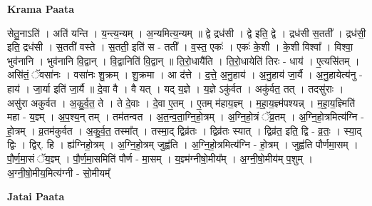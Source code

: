 \documentclass[17pt]{extarticle}
\begin{document}
\textbf{Krama Paata} \newline

सेतु॒नाऽति॑ । अति॑ यन्ति । य॒न्त्य॒न्यम् । अ॒न्यमित्य॒न्यम् ॥ द्वे द्रध॑सी । द्वे इति॒ द्वे । द्रध॑सी स॒तती᳚ । द्रध॑सी॒ इति॒ द्रध॑सी । स॒तती॑ वस्ते । स॒तती॒ इति॑ स - तती᳚ । व॒स्त॒ एकः॑ । एकः॑ के॒शी । के॒शी विश्वा᳚ । विश्वा॒ भुव॑नानि । भुव॑नानि वि॒द्वान् । वि॒द्वानिति॑ वि॒द्वान् ॥ ति॒रो॒धायै॑ति । ति॒रो॒धायेति॑ तिरः - धाय॑ । ए॒त्यसि॑तम् । असि॑तं॒ ॅवसा॑नः । वसा॑नः शु॒क्रम् । शु॒क्रमा । आ द॑त्ते । द॒त्ते॒ अ॒नु॒हाय॑ । अ॒नु॒हाय॑ जा॒र्यै । अ॒नु॒हायेत्य॑नु - हाय॑ । जा॒र्या इति॑ जा॒र्यै ॥ दे॒वा वै । वै यत् । यद् य॒ज्ञे । य॒ज्ञे ऽकु॑र्वत । अकु॑र्वत॒ तत् । तदसु॑राः । असु॑रा अकुर्वत । अ॒कु॒र्व॒त॒ ते । ते दे॒वाः । दे॒वा ए॒तम् । ए॒तम् म॑हाय॒ज्ञ्म् । म॒हा॒य॒ज्ञ्म॑पश्यन्न् । म॒हा॒य॒ज्ञ्मिति॑ महा - य॒ज्ञ्म् । अ॒प॒श्य॒न् तम् । तम॑तन्वत । अ॒त॒न्व॒ता॒ग्नि॒हो॒त्रम् । अ॒ग्नि॒हो॒त्रं ॅव्र॒तम् । अ॒ग्नि॒हो॒त्रमित्य॑ग्नि - हो॒त्रम् । व्र॒तम॑कुर्वत । अ॒कु॒र्व॒त॒ तस्मा᳚त् । तस्मा॒द् द्विव्र॑तः । द्विव्र॑तः स्यात् । द्विव्र॑त॒ इति॒ द्वि - व्र॒तः॒ । स्या॒द् द्विः । द्विर्. हि । ह्य॑ग्निहो॒त्रम् । अ॒ग्नि॒हो॒त्रम् जुह्व॑ति । अ॒ग्नि॒हो॒त्रमित्य॑ग्नि - हो॒त्रम् । जुह्व॑ति पौर्णमा॒सम् । पौ॒र्ण॒मा॒सं ॅय॒ज्ञ्म् । पौ॒र्ण॒मा॒समिति॑ पौर्ण - मा॒सम् । य॒ज्ञ्म॑ग्नीषो॒मीय᳚म् । अ॒ग्नी॒षो॒मीय॑म् प॒शुम् । अ॒ग्नी॒षो॒मीय॒मित्य॑ग्नी - सो॒मीयम्᳚ \newline

\textbf{Jatai Paata} \newline
\end{document}
